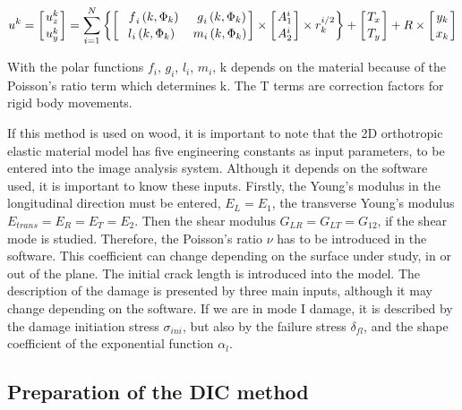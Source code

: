 \begin{equation}
	u^k=\left[{u_z^k\atop u_y^k}\right]=\sum_{i=1}^{N}\left\{\left[{{\ \ f}_i\left(k,\mathrm{\Phi}_k\right)\ \ {\ \ g}_i\left(k,\mathrm{\Phi}_k\right)\atop{\ \ l}_i\left(k,\mathrm{\Phi}_k\right)\ \ {\ \ m}_i\left(k,\mathrm{\Phi}_k\right)}\right]\times\left[{A_1^i\atop A_2^i}\right] \times r_k^{i/2}\right\}+\left[{T_x\atop T_y}\right]+R\times\left[{y_k\atop x_k}\right] 
\end{equation}

With the polar functions $f_i$, $g_i$, $l_i$, $m_i$, k depends on the material because of the Poisson's ratio term which determines k. The T terms are correction factors for rigid body movements.

If this method is used on wood, it is important to note that the 2D orthotropic elastic material model has five engineering constants as input parameters, to be entered into the image analysis system. Although it depends on the software used, it is important to know these inputs. Firstly, the Young's modulus in the longitudinal direction must be entered, $E_L=E_1$, the transverse Young's modulus $E_{trans}=E_R=E_T=E_2$. Then the shear modulus $G_{LR}=G_{LT}=G_{12}$, if the shear mode is studied. Therefore, the Poisson's ratio $\nu$ has to be introduced in the software. This coefficient can change depending on the surface under study, in or out of the plane. The initial crack length is introduced into the model. The description of the damage is presented by three main inputs, although it may change depending on the software. If we are in mode I damage, it is described by the damage initiation stress $\sigma_{ini}$, but also by the failure stress $\delta_{fl}$, and the shape coefficient of the exponential function $\alpha_l$.

\subsection{Preparation of the DIC method}

